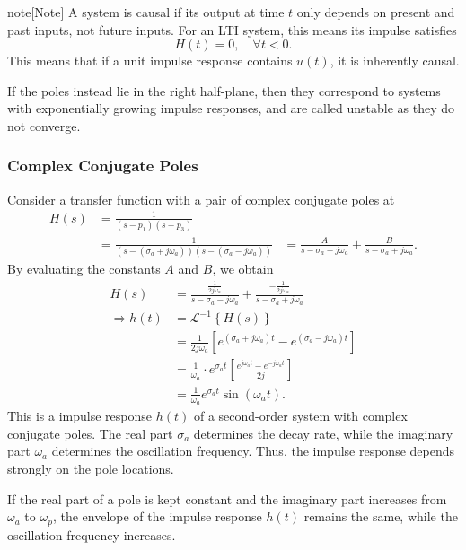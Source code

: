 \documentclass{article}
\begin{document}
\begin{callout}{note}[Note]
\label{note:causality}
A system is causal if its output at time $t$ only depends on present and past inputs, not future inputs. For an LTI system, this means its impulse satisfies
\[
    H(t)=0,\quad \forall t<0.
\]
This means that if a unit impulse response contains $u(t)$, it is inherently causal.
\end{callout}

If the poles instead lie in the right half-plane, then they correspond to systems with exponentially growing impulse responses, and are called unstable as they do not converge.

\subsubsection{Complex Conjugate Poles}
Consider a transfer function with a pair of complex conjugate poles at
\begin{align*}
    H(s) &= \frac{1}{(s-p_1)(s-p_3)} \\
         &= \frac{1}{(s-(\sigma _a+j\omega _a))(s-(\sigma _a-j\omega _a))}
         &= \frac{A}{s-\sigma _a-j\omega _a}+\frac{B}{s-\sigma _a+j\omega _a}.
\end{align*}
By evaluating the constants $A$ and $B$, we obtain
\begin{align*}
    H(s) &= \frac{\frac{1}{2j\omega _a}}{s-\sigma _a-j\omega _a}+\frac{-\frac{1}{2j\omega _a}}{s-\sigma _a+j\omega _a} \\
    \Rightarrow h(t) &= \mathcal{L}^{-1}\left\{ H(s) \right\} \\
                     &= \frac{1}{2j\omega _a}\left[ e^{(\sigma _a+j\omega _a)t}-e^{(\sigma _a-j\omega _a)t} \right] \\
                     &= \frac{1}{\omega _a}\cdot e^{\sigma _at}\left[ \frac{e^{j\omega _at}-e^{-j\omega _at}}{2j} \right] \\
                     &= \frac{1}{\omega _a}e^{\sigma _at}\sin(\omega _at).
\end{align*}
This is a impulse response $h(t)$ of a second-order system with complex conjugate poles. The real part $\sigma _a$ determines the decay rate, while the imaginary part $\omega _a$ determines the oscillation frequency. Thus, the impulse response depends strongly on the pole locations.

If the real part of a pole is kept constant and the imaginary part increases from $\omega _a$ to $\omega _p$, the envelope of the impulse response $h(t)$ remains the same, while the oscillation frequency increases.
\end{document}
